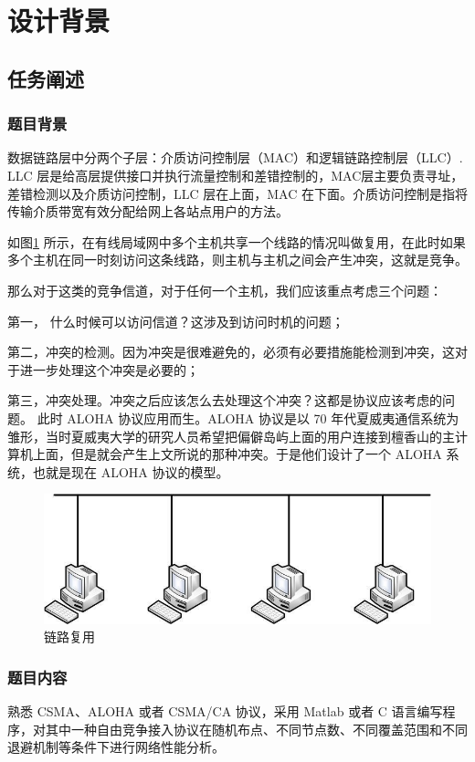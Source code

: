 \documentclass{article}
\begin{document}
	\tableofcontents

	\section{设计背景}
	\subsection{任务阐述}
	\subsubsection{题目背景}
		数据链路层中分两个子层：介质访问控制层（MAC）和逻辑链路控制层（LLC）. LLC 层是给高层提供接口并执行流量控制和差错控制的，MAC层主要负责寻址，差错检测以及介质访问控制，LLC 层在上面，MAC 在下面。介质访问控制是指将传输介质带宽有效分配给网上各站点用户的方法。\par
		如图\ref{fig-1}  所示，在有线局域网中多个主机共享一个线路的情况叫做复用，在此时如果多个主机在同一时刻访问这条线路，则主机与主机之间会产生冲突，这就是竞争。\par
		那么对于这类的竞争信道，对于任何一个主机，我们应该重点考虑三个问题：\par
		第一，	什么时候可以访问信道？这涉及到访问时机的问题；\par
		第二，冲突的检测。因为冲突是很难避免的，必须有必要措施能检测到冲突，这对于进一步处理这个冲突是必要的；\par
		第三，冲突处理。冲突之后应该怎么去处理这个冲突？这都是协议应该考虑的问题。
		此时 ALOHA 协议应用而生。ALOHA 协议是以 70 年代夏威夷通信系统为雏形，当时夏威夷大学的研究人员希望把偏僻岛屿上面的用户连接到檀香山的主计算机上面，但是就会产生上文所说的那种冲突。于是他们设计了一个 ALOHA 系统，也就是现在 ALOHA 协议的模型。
		\\
		\begin{figure}[htbp]
				\centering
				\includegraphics[scale=0.5]{1}
				\caption{链路复用}
				\label{fig-1}
		\end{figure}
	
	\subsubsection{题目内容}
	熟悉 CSMA、ALOHA 或者 CSMA/CA 协议，采用 Matlab 或者 C 语言编写程序，对其中一种自由竞争接入协议在随机布点、不同节点数、不同覆盖范围和不同退避机制等条件下进行网络性能分析。
	
\end{document}
